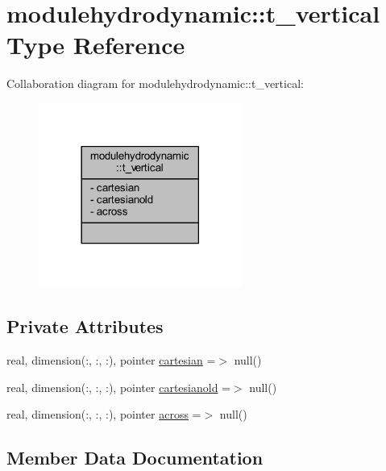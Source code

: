 \hypertarget{structmodulehydrodynamic_1_1t__vertical}{}\section{modulehydrodynamic\+:\+:t\+\_\+vertical Type Reference}
\label{structmodulehydrodynamic_1_1t__vertical}


Collaboration diagram for modulehydrodynamic\+:\+:t\+\_\+vertical\+:\nopagebreak
\begin{figure}[H]
\begin{center}
\leavevmode
\includegraphics[width=189pt]{structmodulehydrodynamic_1_1t__vertical__coll__graph}
\end{center}
\end{figure}
\subsection*{Private Attributes}
\begin{DoxyCompactItemize}
\item 
real, dimension(\+:, \+:, \+:), pointer \mbox{\hyperlink{structmodulehydrodynamic_1_1t__vertical_a7e803e84ec7f372b1b3cd2df1731e431}{cartesian}} =$>$ null()
\item 
real, dimension(\+:, \+:, \+:), pointer \mbox{\hyperlink{structmodulehydrodynamic_1_1t__vertical_a38efb04d6b8310678f4a4bf7ccd0d942}{cartesianold}} =$>$ null()
\item 
real, dimension(\+:, \+:, \+:), pointer \mbox{\hyperlink{structmodulehydrodynamic_1_1t__vertical_ae685a10275b1c741619c32204bc059a0}{across}} =$>$ null()
\end{DoxyCompactItemize}


\subsection{Member Data Documentation}
\mbox{\label{structmodulehydrodynamic_1_1t__vertical_ae685a10275b1c741619c32204bc059a0}} 
